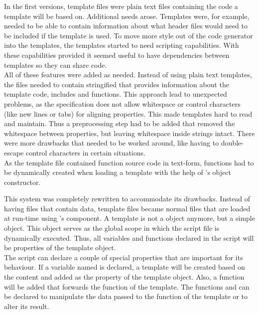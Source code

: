 In the first versions, template files were plain text files containing the code a  template will be based on. Additional needs arose. Templates were, for example, needed to be able to contain information about what  header files would need to be included if the template is used. To move more style out of the code generator into the templates, the templates started to need scripting capabilities. With these capabilities provided it seemed useful to have dependencies between templates so they can share code.\\
All of these features were added as needed. Instead of using plain text templates, the files needed to contain stringified  that provides information about the template code, includes and functions. This approach lead to unexpected problems, as the  specification does not allow whitespace or control characters (like new lines or tabs) for aligning properties. This made templates hard to read and maintain. Thus a preprocessing step had to be added that removed the whitespace between properties, but leaving whitespace inside strings intact. There were more drawbacks that needed to be worked around, like having to double-escape control characters in certain situations.
\\As the template file contained function source code in text-form, functions had to be dynamically created when loading a template with the help of 's  object constructor.

This system was completely rewritten to accommodate its drawbacks. Instead of having files that contain  data, template files became normal  files that are loaded at run-time using 's  component. A template is not a  object anymore, but a simple  object. This object serves as the global scope in which the script file is dynamically executed. Thus, all variables and functions declared in the script will be properties of the template object.\\
The script can declare a couple of special properties that are important for its behaviour. If a variable named  is declared, a  template will be created based on the content and added as the  property of the template object. Also, a  function will be added that forwards the  function of the  template. The functions  and  can be declared to manipulate the data passed to the  function of the  template or to alter its result.

